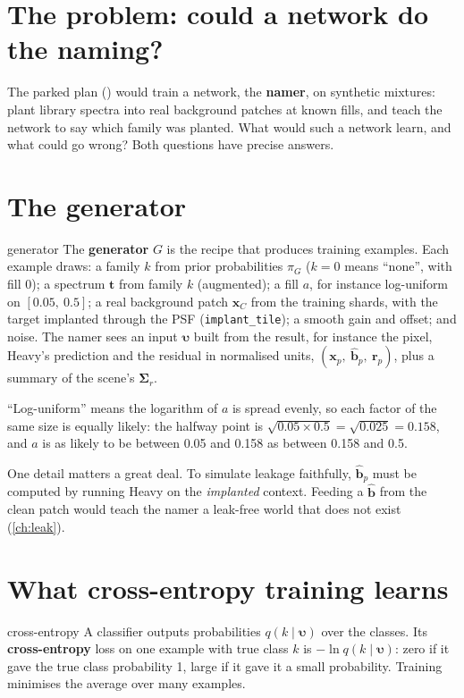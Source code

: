 \documentclass[11pt,a4paper,oneside,openany]{book}
\newcommand{\B}[1]{{\symbf{#1}}}
\newcommand{\B}[1]{{\bm{#1}}}
\newcommand{\vx}{\B{x}}
\newcommand{\vt}{\B{t}}
\newcommand{\vbh}{\hat{\B{b}}}
\newcommand{\vr}{\B{r}}
\newcommand{\vupsilon}{\B{\upsilon}}
\newcommand{\mSig}{\B{\Sigma}}
\begin{document}
\section{The problem: could a network do the naming?}

The parked plan () would train a network, the \textbf{namer}, on synthetic mixtures: plant library spectra into real
background patches at known fills, and teach the network to say which family was planted. What would such a network learn, and what could go wrong? Both questions have
precise answers.

\section{The generator}

\begin{defn}{generator}
The \textbf{generator} $G$ is the recipe that produces training examples. Each example draws: a family $k$ from prior probabilities $\pi_G$ ($k=0$ means ``none'', with
fill 0); a spectrum $\vt$ from family $k$ (augmented); a fill $a$, for instance log-uniform on $[0.05,\ 0.5]$; a real background patch $\vx_C$ from the training shards,
with the target implanted through the PSF (\texttt{implant\_tile}); a smooth gain and offset; and noise. The namer sees an input $\vupsilon$ built from the result, for
instance the pixel, Heavy's prediction and the residual in normalised units, $(\vx_p,\ \vbh_p,\ \vr_p)$, plus a summary of the scene's $\mSig_r$.
\end{defn}

``Log-uniform'' means the logarithm of $a$ is spread evenly, so each factor of the same size is equally likely: the halfway point is $\sqrt{0.05\times0.5}=\sqrt{0.025}=0.158$,
and $a$ is as likely to be between 0.05 and 0.158 as between 0.158 and 0.5.

One detail matters a great deal. To simulate leakage faithfully, $\vbh_p$ must be computed by running Heavy on the \emph{implanted} context. Feeding a $\vbh$ from the
clean patch would teach the namer a leak-free world that does not exist (\cref{ch:leak}).

\section{What cross-entropy training learns}

\begin{defn}{cross-entropy}
A classifier outputs probabilities $q(k\mid\vupsilon)$ over the classes. Its \textbf{cross-entropy} loss on one example with true class $k$ is $-\ln q(k\mid\vupsilon)$: zero
if it gave the true class probability 1, large if it gave it a small probability. Training minimises the average over many examples.
\end{defn}
\end{document}
